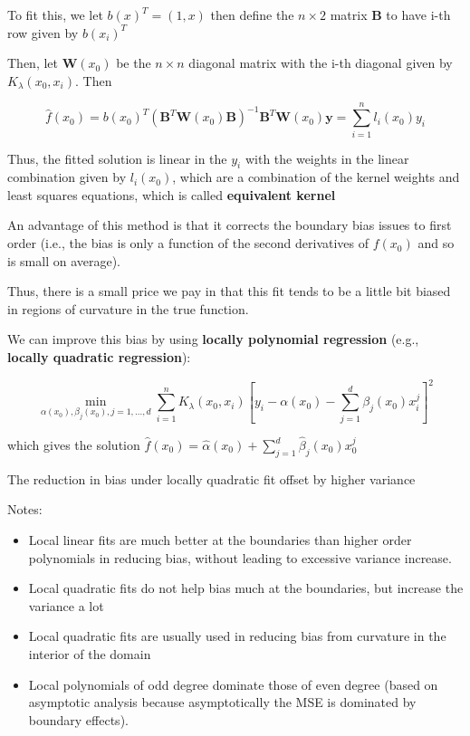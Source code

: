 \documentclass[
]{book}
\begin{document}
To fit this, we let \(b(x)^T = (1,x)\) then define the \(n \times 2\) matrix \(\mathbf{B}\) to have i-th row given by \(b(x_i)^T\)

Then, let \(\mathbf{W}(x_0)\) be the \(n \times n\) diagonal matrix with the i-th diagonal given by \(K_\lambda(x_0, x_i)\). Then

\[
\hat{f}(x_0)=b(x_0)^T (\mathbf{B}^T \mathbf{W}(x_0)\mathbf{B})^{-1}\mathbf{B}^T \mathbf{W}(x_0)\mathbf{y} = \sum_{i=1}^n l_i(x_0)y_i
\]

Thus, the fitted solution is linear in the \(y_i\) with the weights in the linear combination given by \(l_i(x_0)\), which are a combination of the kernel weights and least squares equations, which is called \textbf{equivalent kernel}

An advantage of this method is that it corrects the boundary bias issues to first order (i.e., the bias is only a function of the second derivatives of \(f(x_0)\) and so is small on average).

Thus, there is a small price we pay in that this fit tends to be a little bit biased in regions of curvature in the true function.

We can improve this bias by using \textbf{locally polynomial regression} (e.g., \textbf{locally quadratic regression}):

\[
\min_{\alpha(x_0), \beta_j(x_0),j = 1, \dots, d}\sum_{i=1}^n K_\lambda(x_0,x_i)[y_i - \alpha(x_0)- \sum_{j=1}^d \beta_j (x_0)x_i^j]^2
\]

which gives the solution \(\hat{f}(x_0) = \hat{\alpha}(x_0)+ \sum_{j=1}^d \hat{\beta}_j(x_0)x_0^j\)

The reduction in bias under locally quadratic fit offset by higher variance

Notes:

\begin{itemize}
\item
  Local linear fits are much better at the boundaries than higher order polynomials in reducing bias, without leading to excessive variance increase.
\item
  Local quadratic fits do not help bias much at the boundaries, but increase the variance a lot
\item
  Local quadratic fits are usually used in reducing bias from curvature in the interior of the domain
\item
  Local polynomials of odd degree dominate those of even degree (based on asymptotic analysis because asymptotically the MSE is dominated by boundary effects).
\end{itemize}
\end{document}
